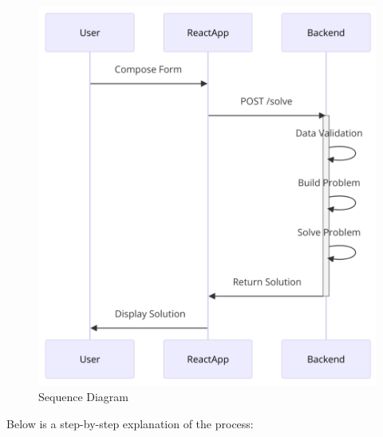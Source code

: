 \documentclass[a4paper, 11pt]{article}
\begin{document}
\begin{figure}[h]
    \centering
    \includegraphics[width=\textwidth]{ ./images/sequenceDiagram.png }
    \caption{Sequence Diagram}
    \label{fig:sequence-diagram}
\end{figure}

 Below is a step-by-step explanation of the process:
\end{document}

